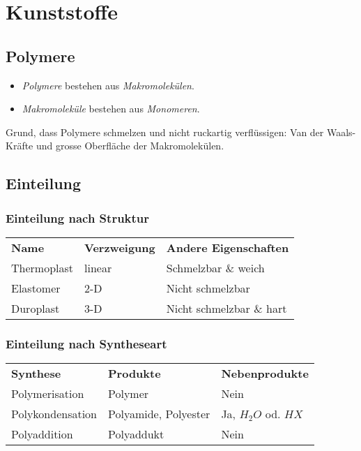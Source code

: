 \section{Kunststoffe}

\subsection{Polymere}

\begin{itemize}
	\item \textit{Polymere} bestehen aus \textit{Makromolekülen}.
	\item \textit{Makromoleküle} bestehen aus \textit{Monomeren}.
\end{itemize}

Grund, dass Polymere schmelzen und nicht ruckartig verflüssigen: Van der Waals-Kräfte und grosse Oberfläche der Makromolekülen.

\subsection{Einteilung}

\subsubsection{Einteilung nach Struktur}

\begin{center}
	\begin{tabular}{l l l}
		\textbf{Name} & \textbf{Verzweigung} & \textbf{Andere Eigenschaften} \\
		Thermoplast & linear & Schmelzbar \& weich \\
		Elastomer & 2-D & Nicht schmelzbar \\
		Duroplast & 3-D & Nicht schmelzbar \& hart
	\end{tabular}
\end{center}

\subsubsection{Einteilung nach Syntheseart}

\begin{center}
	\begin{tabular}{l l l}
		\textbf{Synthese} & \textbf{Produkte} & \textbf{Nebenprodukte} \\
		Polymerisation & Polymer & Nein \\
		Polykondensation & Polyamide, Polyester & Ja, $H_2O$ od. $HX$\\
		Polyaddition & Polyaddukt & Nein
	\end{tabular}
\end{center}

